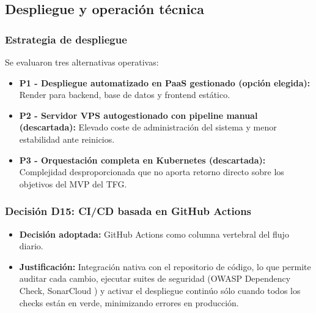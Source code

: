 \FloatBarrier
\subsection{Despliegue y operaci\'on t\'ecnica}

\subsubsection*{Estrategia de despliegue}
Se evaluaron tres alternativas operativas:
\begin{itemize}
    \item \textbf{P1 - Despliegue automatizado en PaaS gestionado (opci\'on elegida):} Render para backend, base de datos y frontend est\'atico.
    \item \textbf{P2 - Servidor VPS autogestionado con pipeline manual (descartada):} Elevado coste de administraci\'on del sistema y menor estabilidad ante reinicios.
    \item \textbf{P3 - Orquestaci\'on completa en Kubernetes (descartada):} Complejidad desproporcionada que no aporta retorno directo sobre los objetivos del MVP del TFG.
\end{itemize}

\subsubsection*{Decisi\'on D15: CI/CD basada en GitHub Actions}
\begin{itemize}
    \item \textbf{Decisi\'on adoptada:} GitHub Actions como columna vertebral del flujo diario.
    \item \textbf{Justificaci\'on:} Integraci\'on nativa con el repositorio de c\'odigo, lo que permite auditar cada cambio, ejecutar suites de seguridad (OWASP Dependency Check, SonarCloud \cite{sonarcloud}) y activar el despliegue contin\'uo s\'olo cuando todos los checks est\'an en verde, minimizando errores en producci\'on.
\end{itemize}

